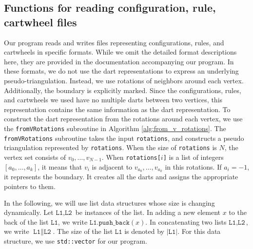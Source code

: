 \documentclass[main.tex]{subfiles}
\begin{document}
\subsection{Functions for reading configuration, rule, cartwheel files}
\label{sub:IO}
\newcommand{\fromVRotations}{\texttt{fromVRotations}\xspace}
Our \Cpp program reads and writes files representing configurations, rules, and cartwheels in specific formats.
While we omit the detailed format descriptions here, they are provided in the documentation accompanying our program.
In these formats, we do not use the dart representations to express an underlying pseudo-triangulation. 
Instead, we use rotations of neighbors around each vertex.
Additionally, the boundary is explicitly marked.
Since the configurations, rules, and cartwheels we used have no multiple darts between two vertices, this representation contains the same information as the dart representation.
To construct the dart representation from the rotations around each vertex, we use the \fromVRotations subroutine in Algorithm \ref{alg:from_v_rotations}.
The \fromVRotations subroutine takes the input \texttt{rotations}, and constructs a pseudo triangulation represented by \texttt{rotations}.
When the size of \texttt{rotations} is $N$, the vertex set consists of $v_0,\ldots,v_{N-1}$.
When \texttt{rotations[$i$]} is a list of integers $[a_0, \ldots, a_k]$, it means that $v_i$ is adjacent to $v_{a_0}, \ldots, v_{a_k}$ in this rotations.
If $a_i=-1$, it represents the boundary.
It creates all the darts and assigns the appropriate pointers to them.

\newcommand{\concat}{\mathbin{\|}}
In the following, we will use list data structures whose size is changing dynamically.
Let $\texttt{L1}, \texttt{L2}$ be instances of the list.
In adding a new element $x$ to the back of the list $\texttt{L1}$, we write $\texttt{L1.push\_back}(x)$.
In concatenating two lists $\texttt{L1}, \texttt{L2}$, we write $\texttt{L1} \concat \texttt{L2}$.
The size of the list $\texttt{L1}$ is denoted by $|\texttt{L1}|$.
For this data structure, we use \texttt{std::vector} for our \Cpp program.
\end{document}
